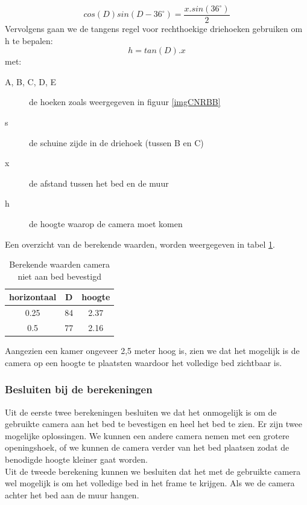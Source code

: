 \begin{displaymath}
cos(D)sin(D-36 ^\circ)=\frac{x . sin(36^\circ)}{2}
\end{displaymath}
Vervolgens gaan we de tangens regel voor rechthoekige driehoeken gebruiken om h te bepalen:
\begin{displaymath}
h=tan(D) . x
\end{displaymath}
met:
\begin{description}
	\item [A, B, C, D, E] de hoeken zoals weergegeven in figuur \ref{imgCNRBB}
	\item[s] de schuine zijde in de driehoek (tussen B en C)
	\item[x] de afstand tussen het bed en de muur
	\item[h] de hoogte waarop de camera moet komen
\end{description}
Een overzicht van de berekende waarden, worden weergegeven in tabel \ref{refTabCNB}.

\begin{table}[hbp]
	\caption{Berekende waarden camera niet aan bed bevestigd}
	\begin{tabular}{|c|c|c|}
		\hline
		horizontaal & D & hoogte \\ \hline
		0.25 & 84 & 2.37 \\ \hline
		0.5 & 77 & 2.16 \\ 
		\hline
	\end{tabular}
	\label{refTabCNB}
\end{table}
Aangezien een kamer ongeveer 2,5 meter hoog is, zien we dat het mogelijk is de camera op een hoogte te plaatsten waardoor het volledige bed zichtbaar is.

\subsubsection{Besluiten bij de berekeningen}
Uit de eerste twee berekeningen besluiten we dat het onmogelijk is om de gebruikte camera aan het bed te bevestigen en heel het bed te zien. Er zijn twee mogelijke oplossingen. We kunnen een andere camera nemen met een grotere openingshoek, of we kunnen de camera verder van het bed plaatsen zodat de benodigde hoogte kleiner gaat worden.\\
Uit de tweede berekening kunnen we besluiten dat het met de gebruikte camera wel mogelijk is om het volledige bed in het frame te krijgen. Als we de camera achter het bed aan de muur hangen.

